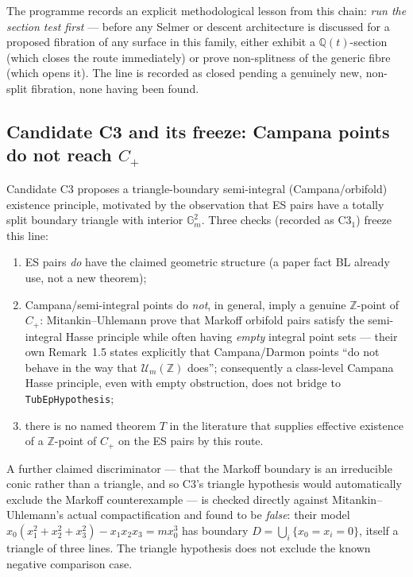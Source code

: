 \documentclass[11pt]{article}
\theoremstyle{plain}
\theoremstyle{definition}
\theoremstyle{remark}
\newcommand{\lean}[1]{\texttt{#1}}
\renewcommand{\_}{\textunderscore\allowbreak}
\newcommand{\Z}{\mathbb{Z}}
\newcommand{\Q}{\mathbb{Q}}
\begin{document}
The programme records an explicit methodological lesson from this chain: \emph{run the section
test first} — before any Selmer or descent architecture is discussed for a proposed fibration of
any surface in this family, either exhibit a $\Q(t)$-section (which closes the route
immediately) or prove non-splitness of the generic fibre (which opens it). The line is
recorded as closed pending a genuinely new, non-split fibration, none having been found.

\subsection{Candidate C3 and its freeze: Campana points do not reach $C_+$}

Candidate C3 proposes a triangle-boundary semi-integral (Campana/orbifold) existence principle,
motivated by the observation that ES pairs have a totally split boundary triangle with interior
$\mathbb G_m^2$. Three checks (recorded as C3$_1$) freeze this line:
\begin{enumerate}[leftmargin=1.6em]
  \item ES pairs \emph{do} have the claimed geometric structure (a paper fact BL already use, not
        a new theorem);
  \item Campana/semi-integral points do \emph{not}, in general, imply a genuine $\Z$-point of
        $C_+$: Mitankin--Uhlemann \cite{MitankinUhlemann2025} prove that Markoff orbifold pairs
        satisfy the semi-integral Hasse principle while often having \emph{empty} integral point
        sets — their own Remark~1.5 states explicitly that Campana/Darmon points ``do not behave
        in the way that $\mathcal U_m(\Z)$ does''; consequently a class-level Campana Hasse
        principle, even with empty obstruction, does not bridge to \lean{TubEpHypothesis};
  \item there is no named theorem $T$ in the literature that supplies effective existence of a
        $\Z$-point of $C_+$ on the ES pairs by this route.
\end{enumerate}
A further claimed discriminator — that the Markoff boundary is an irreducible conic rather than a
triangle, and so C3's triangle hypothesis would automatically exclude the Markoff
counterexample — is checked directly against Mitankin--Uhlemann's actual compactification and
found to be \emph{false}: their model $x_0(x_1^2+x_2^2+x_3^2)-x_1x_2x_3=mx_0^3$ has boundary
$D=\bigcup_i\{x_0=x_i=0\}$, itself a triangle of three lines. The triangle hypothesis does not
exclude the known negative comparison case.
\end{document}

